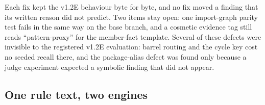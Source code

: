 \documentclass[10pt,a4paper]{article}
\begin{document}
\begin{table}[t]
\end{table}

Each fix kept the v1.2E behaviour byte for byte, and no fix moved a finding that its written reason did not
predict. Two items stay open: one import-graph parity test fails in the same way on the base branch, and a
cosmetic evidence tag still reads ``pattern-proxy'' for the member-fact template. %
Several of these defects were invisible to the registered v1.2E evaluation: barrel routing and the cycle key cost no
seeded recall there, and the package-alias defect was found only because a judge experiment expected a symbolic
finding that did not appear. %

\subsection{One rule text, two engines}\label{sec:v13-interp}
\end{document}
